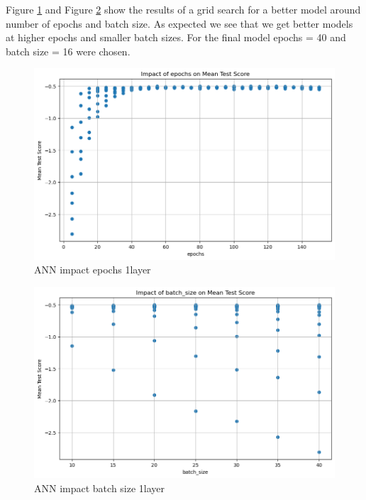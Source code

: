 \documentclass{article}
\begin{document}
Figure \ref{fig:ANN-impact-epochs-1layer} and Figure \ref{fig:ANN-impact-batchsize-1layer} show the results of a grid search for a better model around number of epochs and batch size.
As expected we see that we get better models at higher epochs and smaller batch sizes. For the final model epochs = 40 and batch size = 16 were chosen.


\begin{figure}
	\centering
	\includegraphics[width=\linewidth]{figures/ANN_impact_epochs_1layer.png}
	\caption{ANN impact epochs 1layer}
	\label{fig:ANN-impact-epochs-1layer}
\end{figure}

\begin{figure}
	\centering
	\includegraphics[width=\linewidth]{figures/ANN_impact_batchsize_1layer.png}
	\caption{ANN impact batch size 1layer}
	\label{fig:ANN-impact-batchsize-1layer}
\end{figure}
\end{document}

